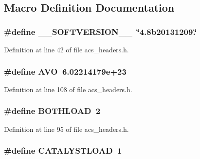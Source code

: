 \subsection{Macro Definition Documentation}
\hypertarget{a00072_aab38659c2fe462437b89a1e85e619dc7}{
\subsubsection[{\-\_\-\-\_\-\-S\-O\-F\-T\-V\-E\-R\-S\-I\-O\-N\-\_\-\-\_\-}]{\setlength{\rightskip}{0pt plus 5cm}\#define \-\_\-\-\_\-\-S\-O\-F\-T\-V\-E\-R\-S\-I\-O\-N\-\_\-\-\_\-~\char`\"{}4.\-8b20131209.\char`\"{}}}\label{a00072_aab38659c2fe462437b89a1e85e619dc7}


Definition at line 42 of file acs\-\_\-headers.\-h.

\hypertarget{a00072_a174754c04acfba9e1f66ba249e68643a}{
\subsubsection[{A\-V\-O}]{\setlength{\rightskip}{0pt plus 5cm}\#define A\-V\-O~6.\-02214179e+23}}\label{a00072_a174754c04acfba9e1f66ba249e68643a}


Definition at line 108 of file acs\-\_\-headers.\-h.

\hypertarget{a00072_afb6d1105a81463fbadceff0217332f68}{
\subsubsection[{B\-O\-T\-H\-L\-O\-A\-D}]{\setlength{\rightskip}{0pt plus 5cm}\#define B\-O\-T\-H\-L\-O\-A\-D~2}}\label{a00072_afb6d1105a81463fbadceff0217332f68}


Definition at line 95 of file acs\-\_\-headers.\-h.

\hypertarget{a00072_a7e521c899f69e37df3501fd0e652c517}{
\subsubsection[{C\-A\-T\-A\-L\-Y\-S\-T\-L\-O\-A\-D}]{\setlength{\rightskip}{0pt plus 5cm}\#define C\-A\-T\-A\-L\-Y\-S\-T\-L\-O\-A\-D~1}}\label{a00072_a7e521c899f69e37df3501fd0e652c517}


